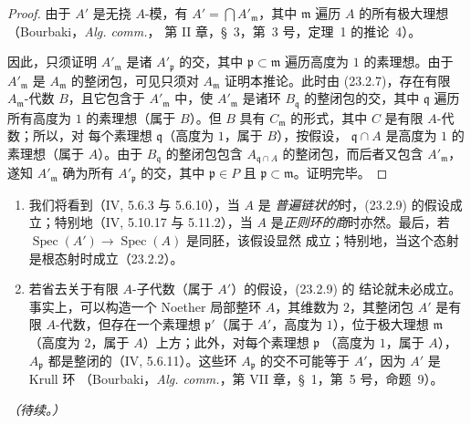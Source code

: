 \begin{proof}
由于 $A'$ 是无挠 $A$-模，有 $A'=\bigcap A'_{\mathfrak m}$，其中
$\mathfrak m$ 遍历 $A$ 的所有极大理想（Bourbaki，\emph{Alg. comm.}，
第 II 章，§~3，第~3 号，定理~1 的推论~4）。


因此，只须证明 $A'_{\mathfrak m}$ 是诸 $A'_{\mathfrak p}$ 的交，其中
$\mathfrak p\subset\mathfrak m$ 遍历高度为 $1$ 的素理想。由于
$A'_{\mathfrak m}$ 是 $A_{\mathfrak m}$ 的整闭包，可见只须对
$A_{\mathfrak m}$ 证明本推论。此时由 (23.2.7)，存在有限
$A_{\mathfrak m}$-代数 $B$，且它包含于 $A'_{\mathfrak m}$ 中，使
$A'_{\mathfrak m}$ 是诸环 $B_{\mathfrak q}$ 的整闭包的交，其中
$\mathfrak q$ 遍历所有高度为 $1$ 的素理想（属于 $B$）。但 $B$ 具有
$C_{\mathfrak m}$ 的形式，其中 $C$ 是有限 $A$-代数；所以，对
每个素理想 $\mathfrak q$（高度为 $1$，属于 $B$），按假设，
$\mathfrak q\cap A$ 是高度为 $1$ 的素理想（属于 $A$）。由于 $B_{\mathfrak q}$ 的整闭包包含
$A_{\mathfrak q\cap A}$ 的整闭包，而后者又包含 $A'_{\mathfrak m}$，
遂知 $A'_{\mathfrak m}$ 确为所有 $A'_{\mathfrak p}$ 的交，其中
$\mathfrak p\in P$ 且 $\mathfrak p\subset\mathfrak m$。证明完毕。
\end{proof}

\begin{remarks}[23.2.10]
\label{0.23.2.10-fr}
\begin{enumerate}
  \item[(i)] 我们将看到（IV, 5.6.3 与 5.6.10），当 $A$ 是
  \emph{普遍链状的}时，(23.2.9) 的假设成立；特别地（IV, 5.10.17 与
  5.11.2），当 $A$ 是\emph{正则环的商}时亦然。最后，若
  $\operatorname{Spec}(A')\to\operatorname{Spec}(A)$ 是同胚，该假设显然
  成立；特别地，当这个态射是根态射时成立（23.2.2）。

  \item[(ii)] 若省去关于有限 $A$-子代数（属于 $A'$）的假设，(23.2.9) 的
  结论就未必成立。事实上，可以构造一个 Noether 局部整环 $A$，其维数为
  $2$，其整闭包 $A'$ 是有限 $A$-代数，但存在一个素理想
  $\mathfrak p'$（属于 $A'$，高度为 $1$），位于极大理想 $\mathfrak m$
  （高度为 $2$，属于 $A$）上方；此外，对每个素理想 $\mathfrak p$
  （高度为 $1$，属于 $A$），
  $A_{\mathfrak p}$ 都是整闭的（IV, 5.6.11）。这些环
  $A_{\mathfrak p}$ 的交不可能等于 $A'$，因为 $A'$ 是 Krull 环
  （Bourbaki，\emph{Alg. comm.}，第 VII 章，§~1，第~5 号，命题~9）。
\end{enumerate}
\end{remarks}

\begin{flushright}
\emph{（待续。）}
\end{flushright}

